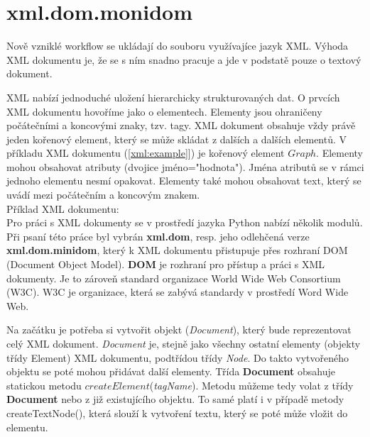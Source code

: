 \newpage

\section{xml.dom.monidom}
\nocite{python:www}
\nocite{py3:book}

Nově vzniklé workflow se ukládají do souboru využívajíce jazyk  XML. Výhoda XML dokumentu je, že se s ním snadno pracuje a jde v podstatě pouze o textový dokument.

XML nabízí jednoduché uložení hierarchicky strukturovaných dat. O prvcích XML dokumentu hovoříme jako o elementech. Elementy jsou ohraničeny počátečními a koncovými znaky, tzv. tagy. XML dokument obsahuje vždy právě jeden kořenový element, který se může skládat z dalších a dalších elementů. V příkladu XML dokumentu (\autoref{xml:example}]) je kořenový element $Graph$. Elementy mohou obsahovat atributy (dvojice jméno="hodnota").  Jména atributů se v rámci jednoho elementu nesmí opakovat. Elementy také mohou obsahovat text, který se uvádí mezi počátečním a koncovým znakem. \\

\noindent Příklad XML dokumentu$:$ \\



Pro práci s XML dokumenty se v prostředí jazyka Python nabízí několik modulů. Při psaní této práce byl vybrán  \textbf{xml.dom}, resp. jeho odlehčená verze  \textbf{xml.dom.minidom}, který k XML dokumentu přistupuje přes rozhraní DOM (Document Object Model).  \textbf{DOM}  je rozhraní pro přístup a práci s XML dokumenty. Je to zároveň standard organizace World Wide Web Consortium (W3C). W3C je organizace, která se zabývá standardy v prostředí Word Wide Web.

Na začátku je potřeba si vytvořit objekt (\textit{Document}), který bude reprezentovat celý XML dokument. \textit{Document} je, stejně jako všechny ostatní elementy (objekty třídy Element) XML dokumentu, podtřídou třídy \textit{Node}. Do takto vytvořeného objektu se poté mohou přidávat další elementy. Třída \textbf{Document} obsahuje statickou metodu $createElement$(\textit{tagName}). Metodu můžeme tedy volat z třídy \textbf{Document} nebo z již existujícího objektu. To samé platí i v případě metody createTextNode(), která slouží k vytvoření textu, který se poté může vložit do elementu.

